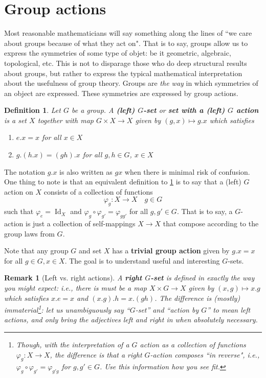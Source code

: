 \documentclass[12pt]{article}
\numberwithin{equation}{subsection}
\newtheorem{defn}[subsection]{Definition}
\theoremstyle{note}
\newtheorem{remark}[subsection]{Remark}
\newcommand{\Id}{\operatorname{Id}}
\begin{document}
\section{Group actions}

Most reasonable mathematicians will say something along the lines of ``we care about groups because of what they act on". That is to say, groups allow us to express the symmetries of some type of objet: be it geometric, algebraic, topological, etc. This is not to disparage those who do deep structural results about groups, but rather to express the typical mathematical interpretation about the usefulness of group theory. Groups are \textit{the way} in which symmetries of an object are expressed. These symmetries are expressed by group actions. 


\begin{defn} \label{group-action}
	Let $G$ be a group. A \textbf{(left) $G$-set} or \textbf{set with a (left)  $G$ action} is a set $X$ together with map $G\times X\to X$ given by $(g,x)\mapsto g.x$ which satisfies \begin{enumerate}[label=\roman*.]
		\item $e.x=x$ for all $x\in X$
		\item $g.(h.x)=(gh).x$ for all $g,h\in G$, $x\in X$
	\end{enumerate}
\end{defn}

The notation $g.x$ is also written as $gx$ when there is minimal risk of confusion. One thing to note is that an equivalent definition to \ref{group-action} is to say that a (left) $G$ action on $X$ consists of a collection of functions \[ \varphi_g\colon X\to X \quad g\in G\] such that $\varphi_e=\Id_X$ and $\varphi_g\circ \varphi_{g'}=\varphi_{gg'}$ for all $g,g'\in G$. That is to say, a $G$-action is just a collection of self-mappings $X\to X$ that compose according to the group laws from $G$.

Note that any group $G$ and set $X$ has a \textbf{trivial group action} given by $g.x=x$ for all $g\in G, x\in X$. The goal is to understand useful and interesting $G$-sets. 

\begin{remark}[Left vs. right actions]
A \textbf{right $G$-set} is defined in exactly the way you might expect: i.e., there is must be a  map $X\times G\to X$ given by $(x,g)\mapsto x.g$ which satisfies $x.e=x$ and $(x.g).h=x.(gh)$. The difference is (mostly) immaterial\footnote{Though, with the interpretation of a $G$ action as a collection of functions $\varphi_g\colon X\to X$, the difference is that a right $G$-action composes ``in reverse", i.e., $\varphi_g\circ \varphi_{g'}=\varphi_{g'g}$ for $g,g'\in G$. Use this information how you see fit.}: let us unambiguously say ``$G$-set'' and ``action by $G$'' to mean left actions, and only bring the adjectives left and right in when absolutely necessary. 
\end{remark}
\end{document}
